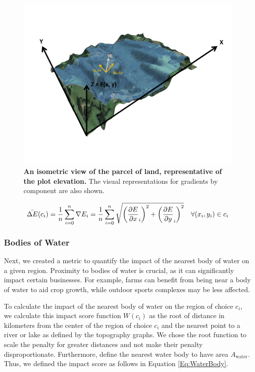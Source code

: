 \documentclass{mcmthesis}
\begin{document}
\begin{figure}[!htbp]
    \centering
    \includegraphics[trim={2cm 3.5cm 3.5cm 2cm}, scale=0.38]{figures/3dplot.pdf}
    \caption{\textbf{An isometric view of the parcel of land, representative of the plot elevation.} The visual representations for gradients by component are also shown.}
    \label{fig:isometric_parcel}
\end{figure}

\begin{align}
    \Bar{\Delta E}(c_i) & = \frac{1}{n} \sum_{i=0}^{n} \nabla E_i = \frac{1}{n}\sum_{i=0}^{n} \sqrt{\left(\frac{\partial E}{\partial x}_i\right)^2 + \left(\frac{\partial E}{\partial y}_i\right)^2} & \forall (x_i, y_i) \in c_i
    \label{Eq:ElevChange}
\end{align}

\subsubsection{Bodies of Water}

Next, we created a metric to quantify the impact of the nearest body of water on a given region. Proximity to bodies of water is crucial, as it can significantly impact certain businesses. For example, farms can benefit from being near a body of water to aid crop growth, while outdoor sports complexes may be less affected.


To calculate the impact of the nearest body of water on the region of choice $c_i$, we calculate this impact score function $W(c_i)$ as the root of distance in kilometers from the center of the region of choice $c_i$ and the nearest point to a river or lake as defined by the topography graphs. We chose the root function to scale the penalty for greater distances and not make their penalty disproportionate. Furthermore, define the nearest water body to have area $A_\text{water}$. Thus, we defined the impact score as follows in Equation \ref{Eq:WaterBody}.
\end{document}
